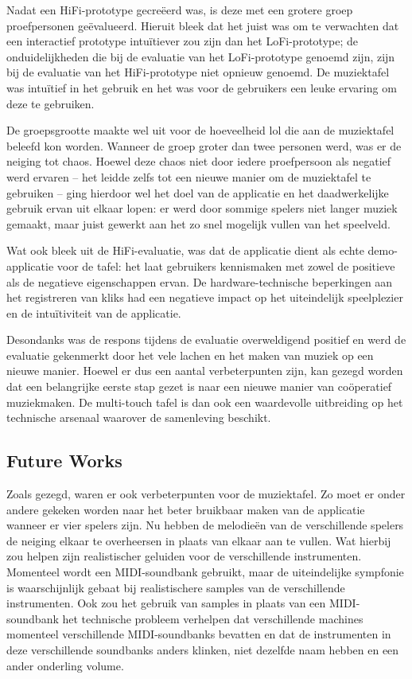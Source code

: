 \documentclass{acm}
\begin{document}
Nadat een HiFi-prototype gecre\"eerd was, is deze met een grotere groep proefpersonen ge\"evalueerd. Hieruit bleek dat het juist was om te verwachten dat een interactief prototype intu\"itiever zou zijn dan het LoFi-prototype; de onduidelijkheden die bij de evaluatie van het LoFi-prototype genoemd zijn, zijn bij de evaluatie van het HiFi-prototype niet opnieuw genoemd. De muziektafel was intu\"itief in het gebruik en het was voor de gebruikers een leuke ervaring om deze te gebruiken.

De groepsgrootte maakte wel uit voor de hoeveelheid lol die aan de muziektafel beleefd kon worden. Wanneer de groep groter dan twee personen werd, was er de neiging tot chaos. Hoewel deze chaos niet door iedere proefpersoon als negatief werd ervaren -- het leidde zelfs tot een nieuwe manier om de muziektafel te gebruiken -- ging hierdoor wel het doel van de applicatie en het daadwerkelijke gebruik ervan uit elkaar lopen: er werd door sommige spelers niet langer muziek gemaakt, maar juist gewerkt aan het zo snel mogelijk vullen van het speelveld.

Wat ook bleek uit de HiFi-evaluatie, was dat de applicatie dient als echte demo-applicatie voor de tafel: het laat gebruikers kennismaken met zowel de positieve als de negatieve eigenschappen ervan. De hardware-technische beperkingen aan het registreren van kliks had een negatieve impact op het uiteindelijk speelplezier en de intu\"itiviteit van de applicatie.

Desondanks was de respons tijdens de evaluatie overweldigend positief en werd de evaluatie gekenmerkt door het vele lachen en het maken van muziek op een nieuwe manier. Hoewel er dus een aantal verbeterpunten zijn, kan gezegd worden dat een belangrijke eerste stap gezet is naar een nieuwe manier van co\"operatief muziekmaken. De multi-touch tafel is dan ook een waardevolle uitbreiding op het technische arsenaal waarover de samenleving beschikt.

\subsection{Future Works}
Zoals gezegd, waren er ook verbeterpunten voor de muziektafel. Zo moet er onder andere gekeken worden naar het beter bruikbaar maken van de applicatie wanneer er vier spelers zijn. Nu hebben de melodie\"en van de verschillende spelers de neiging elkaar te overheersen in plaats van elkaar aan te vullen. Wat hierbij zou helpen zijn realistischer geluiden voor de verschillende instrumenten. Momenteel wordt een MIDI-soundbank gebruikt, maar de uiteindelijke sympfonie is waarschijnlijk gebaat bij realistischere samples van de verschillende instrumenten. Ook zou het gebruik van samples in plaats van een MIDI-soundbank het technische probleem verhelpen dat verschillende machines momenteel verschillende MIDI-soundbanks bevatten en dat de instrumenten in deze verschillende soundbanks anders klinken, niet dezelfde naam hebben en een ander onderling volume.
\end{document}
